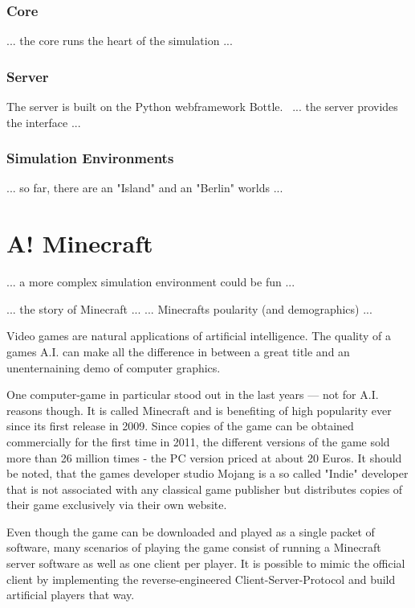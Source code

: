             \subsubsection{Core}
... the core runs the heart of the simulation ...

            \subsubsection{Server}
The server is built on the Python webframework Bottle.~\cite{conf/agi/Bach12}
... the server provides the interface ...

            \subsubsection{Simulation Environments}
... so far, there are an "Island" and an "Berlin" worlds ...

    \section{A! Minecraft}
... a more complex simulation environment could be fun ...

... the story of Minecraft ...
... Minecrafts poularity (and demographics) ...

Video games are natural applications of artificial intelligence. The quality of a games A.I. can make all the difference in between a great title and an unenternaining demo of computer graphics.

One computer-game in particular stood out in the last years --- not for A.I. reasons though. It is called Minecraft and is benefiting of high popularity ever since its first release in 2009. Since copies of the game can be obtained commercially for the first time in 2011, the different versions of the game sold more than 26 million times - the PC version priced at about 20 Euros. It should be noted, that the games developer studio Mojang is a so called "Indie" developer that is not associated with any classical game publisher but distributes copies of their game exclusively via their own website.

Even though the game can be downloaded and played as a single packet of software, many scenarios of playing the game consist of running a Minecraft server software as well as one client per player. It is possible to mimic the official client by implementing the reverse-engineered Client-Server-Protocol and build artificial players that way.

